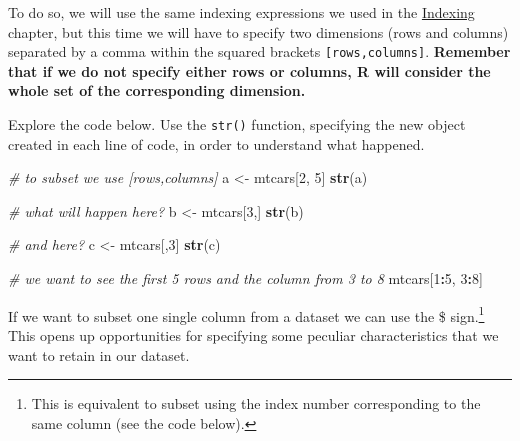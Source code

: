 \documentclass[
]{article}
\newenvironment{Shaded}{\begin{snugshade}}{\end{snugshade}}
\newcommand{\CommentTok}[1]{\textcolor[rgb]{0.56,0.35,0.01}{\textit{#1}}}
\newcommand{\DecValTok}[1]{\textcolor[rgb]{0.00,0.00,0.81}{#1}}
\newcommand{\FunctionTok}[1]{\textcolor[rgb]{0.13,0.29,0.53}{\textbf{#1}}}
\newcommand{\NormalTok}[1]{#1}
\newcommand{\OtherTok}[1]{\textcolor[rgb]{0.56,0.35,0.01}{#1}}
\newcommand{\SpecialCharTok}[1]{\textcolor[rgb]{0.81,0.36,0.00}{\textbf{#1}}}
\begin{document}
To do so, we will use the same indexing expressions we used in the
\protect\hyperlink{indexing}{Indexing} chapter, but this time we will have to specify two dimensions
(rows and columns) separated by a comma within the squared brackets
\texttt{{[}rows,columns{]}}. \textbf{Remember that if we do not specify either rows or
columns, R will consider the whole set of the corresponding dimension.}

Explore the code below. Use the \texttt{str()} function, specifying the new
object created in each line of code, in order to understand what
happened.

\begin{Shaded}
\begin{Highlighting}[]
\CommentTok{\# to subset we use [rows,columns]}
\NormalTok{a }\OtherTok{\textless{}{-}}\NormalTok{ mtcars[}\DecValTok{2}\NormalTok{, }\DecValTok{5}\NormalTok{]}
\FunctionTok{str}\NormalTok{(a)}

\CommentTok{\# what will happen here?}
\NormalTok{b }\OtherTok{\textless{}{-}}\NormalTok{ mtcars[}\DecValTok{3}\NormalTok{,]}
\FunctionTok{str}\NormalTok{(b)}

\CommentTok{\# and here?}
\NormalTok{c }\OtherTok{\textless{}{-}}\NormalTok{ mtcars[,}\DecValTok{3}\NormalTok{]}
\FunctionTok{str}\NormalTok{(c)}

\CommentTok{\# we want to see the first 5 rows and the column from 3 to 8}
\NormalTok{mtcars[}\DecValTok{1}\SpecialCharTok{:}\DecValTok{5}\NormalTok{, }\DecValTok{3}\SpecialCharTok{:}\DecValTok{8}\NormalTok{]}
\end{Highlighting}
\end{Shaded}

If we want to subset one single column from a dataset we can use the \$
sign.\footnote{This is equivalent to subset using the index number corresponding
  to the same column (see the code below).} This opens up opportunities for specifying some peculiar
characteristics that we want to retain in our dataset.
\end{document}
